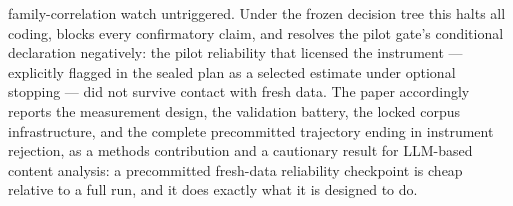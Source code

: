 family-correlation watch untriggered. Under the frozen decision tree this halts all coding, blocks every confirmatory claim, and resolves the pilot gate's conditional declaration negatively: the pilot reliability that licensed the instrument --- explicitly flagged in the sealed plan as a selected estimate under optional stopping --- did not survive contact with fresh data. The paper accordingly reports the measurement design, the validation battery, the locked corpus infrastructure, and the complete precommitted trajectory ending in instrument rejection, as a methods contribution and a cautionary result for LLM-based content analysis: a precommitted fresh-data reliability checkpoint is cheap relative to a full run, and it does exactly what it is designed to do.
